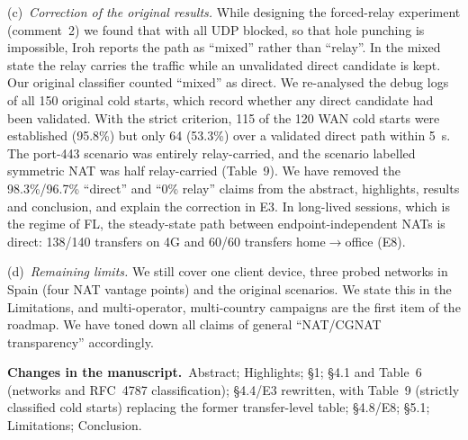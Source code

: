\documentclass[11pt,a4paper]{article}
\newcommand{\changes}{\par\smallskip\noindent\textbf{Changes in the manuscript.}~}
\begin{document}
(c)~\emph{Correction of the original results.} While designing the forced-relay experiment (comment~2) we found that with all UDP blocked, so that hole punching is impossible, Iroh reports the path as ``mixed'' rather than ``relay''. In the mixed state the relay carries the traffic while an unvalidated direct candidate is kept. Our original classifier counted ``mixed'' as direct. We re-analysed the debug logs of all 150 original cold starts, which record whether any direct candidate had been validated. With the strict criterion, 115 of the 120 WAN cold starts were established (95.8\%) but only 64 (53.3\%) over a validated direct path within 5~s. The port-443 scenario was entirely relay-carried, and the scenario labelled symmetric NAT was half relay-carried (Table~9). We have removed the 98.3\%/96.7\% ``direct'' and ``0\% relay'' claims from the abstract, highlights, results and conclusion, and explain the correction in E3. In long-lived sessions, which is the regime of FL, the steady-state path between endpoint-independent NATs is direct: 138/140 transfers on 4G and 60/60 transfers home$\to$office (E8).

(d)~\emph{Remaining limits.} We still cover one client device, three probed networks in Spain (four NAT vantage points) and the original scenarios. We state this in the Limitations, and multi-operator, multi-country campaigns are the first item of the roadmap. We have toned down all claims of general ``NAT/CGNAT transparency'' accordingly.

\changes Abstract; Highlights; \S1; \S4.1 and Table~6 (networks and RFC~4787 classification); \S4.4/E3 rewritten, with Table~9 (strictly classified cold starts) replacing the former transfer-level table; \S4.8/E8; \S5.1; Limitations; Conclusion.
\end{document}
